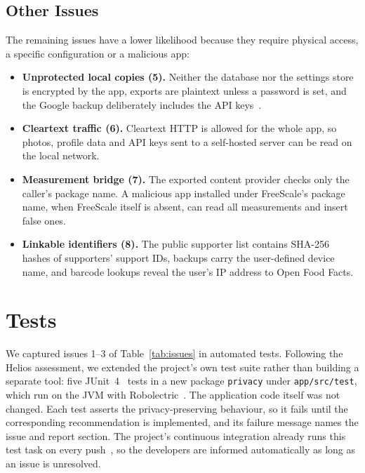 \documentclass[a4paper,12pt]{article}
\begin{document}
\subsection{Other Issues}
\label{sec:issue-other}
The remaining issues have a lower likelihood because they require physical access, a specific
configuration or a malicious app:
\begin{itemize}
  \item \textbf{Unprotected local copies (5).} Neither the database nor the settings store is
        encrypted by the app, exports are plaintext unless a password is set, and the Google
        backup deliberately includes the API keys~\cite{android-autobackup}.
  \item \textbf{Cleartext traffic (6).} Cleartext HTTP is allowed for the whole app, so photos,
        profile data and API keys sent to a self-hosted server can be read on the local network.
  \item \textbf{Measurement bridge (7).} The exported content provider checks only the caller's
        package name. A malicious app installed under FreeScale's package name, when FreeScale
        itself is absent, can read all measurements and insert false ones.
  \item \textbf{Linkable identifiers (8).} The public supporter list contains SHA-256 hashes of
        supporters' support IDs, backups carry the user-defined device name, and barcode lookups
        reveal the user's IP address to Open Food Facts.
\end{itemize}

\section{Tests}
\label{sec:tests}

We captured issues 1--3 of Table~\ref{tab:issues} in automated tests. Following the Helios
assessment, we extended the project's own test suite rather than building a separate tool: five
JUnit~4~\cite{junit4} tests in a new package \texttt{privacy} under \texttt{app/src/test}, which
run on the JVM with Robolectric~\cite{robolectric}. The application code itself was not changed.
Each test asserts the privacy-preserving behaviour, so it fails until the corresponding
recommendation is implemented, and its failure message names the issue and report section. The
project's continuous integration already runs this test task on every push~\cite{fitbuddy-repo},
so the developers are informed automatically as long as an issue is unresolved.
\end{document}
